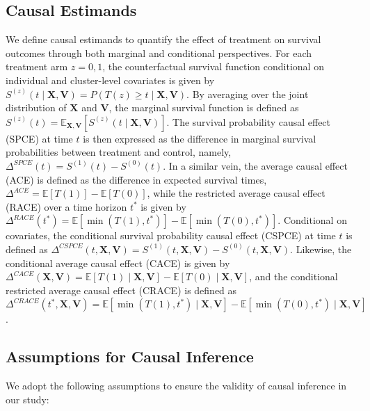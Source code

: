 \documentclass[useAMS,referee]{biom}
\begin{document}
\subsection{Causal Estimands}

We define causal estimands to quantify the effect of treatment on survival outcomes through both marginal and conditional perspectives. For each treatment arm \(z=0,1\), the counterfactual survival function conditional on individual and cluster-level covariates is given by \(S^{(z)}(t \mid \bm{X}, \bm{V}) = P(T(z) \ge t \mid \bm{X}, \bm{V})\). By averaging over the joint distribution of \(\bm{X}\) and \(\bm{V}\), the marginal survival function is defined as \(S^{(z)}(t) = \mathbb{E}_{\bm{X},\bm{V}}[S^{(z)}(t \mid \bm{X},\bm{V})]\). The survival probability causal effect (SPCE) at time \(t\) is then expressed as the difference in marginal survival probabilities between treatment and control, namely, \(\Delta^{SPCE}(t) = S^{(1)}(t) - S^{(0)}(t)\). In a similar vein, the average causal effect (ACE) is defined as the difference in expected survival times, \(\Delta^{ACE} = \mathbb{E}[T(1)] - \mathbb{E}[T(0)]\), while the restricted average causal effect (RACE) over a time horizon \(t^*\) is given by \(\Delta^{RACE}(t^*) = \mathbb{E}[\min(T(1), t^*)] - \mathbb{E}[\min(T(0), t^*)]\). Conditional on covariates, the conditional survival probability causal effect (CSPCE) at time \(t\) is defined as \(\Delta^{CSPCE}(t, \bm{X}, \bm{V}) = S^{(1)}(t, \bm{X}, \bm{V}) - S^{(0)}(t, \bm{X}, \bm{V})\). Likewise, the conditional average causal effect (CACE) is given by \(\Delta^{CACE}(\bm{X}, \bm{V}) = \mathbb{E}[T(1) \mid \bm{X}, \bm{V}] - \mathbb{E}[T(0) \mid \bm{X}, \bm{V}]\), and the conditional restricted average causal effect (CRACE) is defined as \(\Delta^{CRACE}(t^*, \bm{X}, \bm{V}) = \mathbb{E}[\min(T(1), t^*) \mid \bm{X}, \bm{V}] - \mathbb{E}[\min(T(0), t^*) \mid \bm{X}, \bm{V}]\).



\subsection{Assumptions for Causal Inference}

We adopt the following assumptions to ensure the validity of causal inference in our study:
\end{document}
